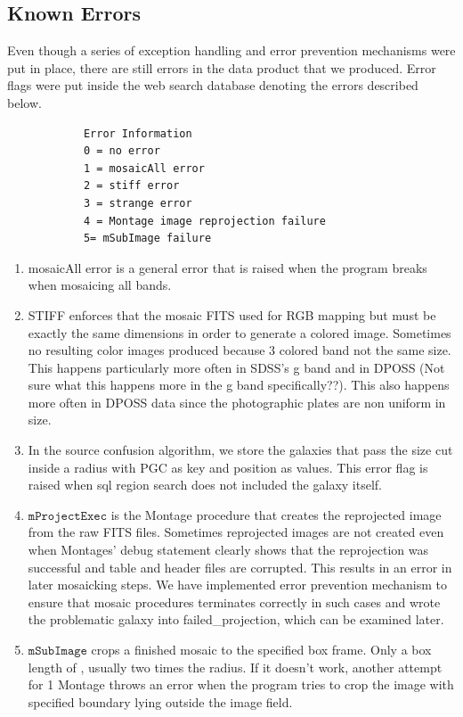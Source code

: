 \documentclass[5p]{elsarticle}
\begin{document}
	\subsection{Known Errors}
	Even though a series of exception handling and error prevention mechanisms were put in place,  there are still errors in the data product that we produced. Error flags were put inside the web search database denoting the errors described below.
	\begin{verbatim}
			Error Information
			0 = no error
			1 = mosaicAll error
			2 = stiff error 
			3 = strange error
			4 = Montage image reprojection failure
			5= mSubImage failure
	\end{verbatim}
	 	\begin{enumerate}
	 	\item  mosaicAll error is a general error that is raised when the program breaks when mosaicing all bands.
	 	\item  STIFF  enforces that the mosaic FITS used for RGB mapping but must be exactly the same dimensions in order to generate a colored image. Sometimes no resulting color images produced because 3 colored band not the same size. This happens particularly more often in SDSS's g band and in DPOSS (Not sure what this happens more in the g band specifically??). This also happens more often in DPOSS data since the photographic plates are non uniform in size. 
	 	\item  In the source confusion algorithm, we store the galaxies that pass the size cut inside a radius with PGC as key and position as values. This error flag is raised when sql region search does not included the galaxy itself. 
	 	\item  $\texttt{mProjectExec}$ is the Montage procedure that creates the reprojected image from the raw FITS files. Sometimes reprojected images are not created even when Montages' debug statement clearly shows that the reprojection was successful and table and header files are corrupted. This results in an error in later mosaicking steps. We have implemented error prevention mechanism to ensure that mosaic procedures terminates correctly in such cases and wrote the problematic galaxy into failed\_projection, which can be examined later. 
	 	\item  $\texttt{mSubImage}$ crops a finished mosaic to the specified box frame. Only a box length of , usually two times the radius. If it doesn't work, another attempt for 1 Montage throws an error when the program tries to crop the image with specified boundary lying outside the image field. 
	 	
	 	\end{enumerate}
	 	
\end{document}
